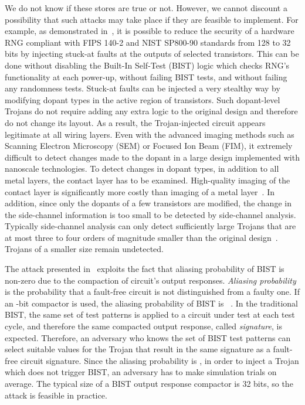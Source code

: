 \documentclass[a4paper]{llncs}
\begin{document}
We do not know if these stores are true or not. However, we cannot discount a possibility that such attacks may take place if they are feasible to implement.
For example, as demonstrated in~\cite{BeRPB13}, it is possible to reduce the security of a hardware RNG compliant with FIPS 140-2 and NIST SP800-90 standards from 128 to 32 bits by injecting stuck-at faults at the outputs of selected transistors. This can be done without disabling the Built-In Self-Test (BIST) logic which checks RNG's functionality at each power-up, without failing BIST tests, and without failing any randomness tests. 
Stuck-at faults can be injected a very stealthy way by modifying dopant types in the active region of transistors. Such dopant-level Trojans do not require adding any extra logic to the original design and therefore do not change its layout. As a result, the Trojan-injected circuit appears legitimate at all wiring layers. Even with the advanced imaging methods such as 
Scanning Electron Microscopy (SEM) or Focused Ion Beam (FIM), it extremely difficult to detect changes made to the dopant in a large design implemented with nanoscale technologies. To detect changes in dopant types, in addition to all metal layers, the contact layer has to be examined. High-quality imaging of the contact layer is significantly more costly than imaging of a metal layer~\cite{SuSFT14}. In addition, since only the dopants of a few transistors are modified, the change in the side-channel information is too small to be detected by side-channel analysis. Typically side-channel analysis can only detect sufficiently large Trojans that are at most three to four orders of magnitude smaller than the original design~\cite{AgBKRS07}. Trojans of a smaller size remain undetected.

The attack presented in~\cite{BeRPB13} exploits the fact that aliasing probability of BIST is non-zero due to the compaction of circuit's output responses. 
{\em Aliasing probability} is the probability that a fault-free circuit is not distinguished from a faulty one. If an -bit compactor is used, the aliasing probability of BIST is ~\cite{DaOFE90}. In the traditional BIST, the same set of test patterns is applied to a circuit under test at each test cycle, and therefore the same compacted output response, called {\em signature}, is expected. 
Therefore, an adversary who knows the set of BIST test patterns can select suitable values for the Trojan that result in the same signature as a fault-free circuit signature. Since the aliasing probability is , in order to inject a Trojan which does not trigger BIST, an adversary has to make  simulation trials on average. The typical size of a BIST output response compactor
is 32 bits, so the attack is feasible in practice.
\end{document}
